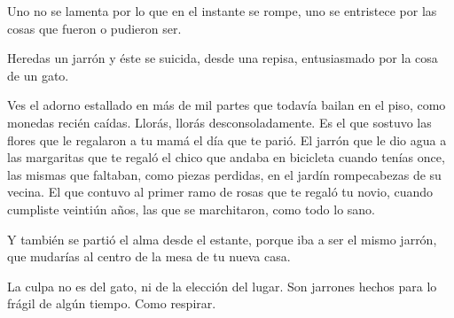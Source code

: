 
Uno no se lamenta por lo que en el instante se rompe, uno se entristece
por las cosas que fueron o pudieron ser.

Heredas un jarrón y éste se suicida, desde una repisa, entusiasmado por
la cosa de un gato.

Ves el adorno estallado en más de mil partes que todavía bailan en el piso,
como monedas recién caídas. Llorás, llorás desconsoladamente. Es el que 
sostuvo las flores que le regalaron a tu mamá el día que te parió. El 
jarrón que le dio agua a las margaritas que te regaló el chico que andaba
en bicicleta cuando tenías once, las mismas que faltaban, como piezas
perdidas, en el jardín rompecabezas de su vecina. El que contuvo al primer
ramo de rosas que te regaló tu novio, cuando cumpliste veintiún años, las 
que se marchitaron, como todo lo sano.

Y también se partió el alma desde el estante, porque iba a ser el mismo
jarrón, que mudarías al centro de la mesa de tu nueva casa.

La culpa no es del gato, ni de la elección del lugar. Son jarrones hechos
para lo frágil de algún tiempo. Como respirar.
